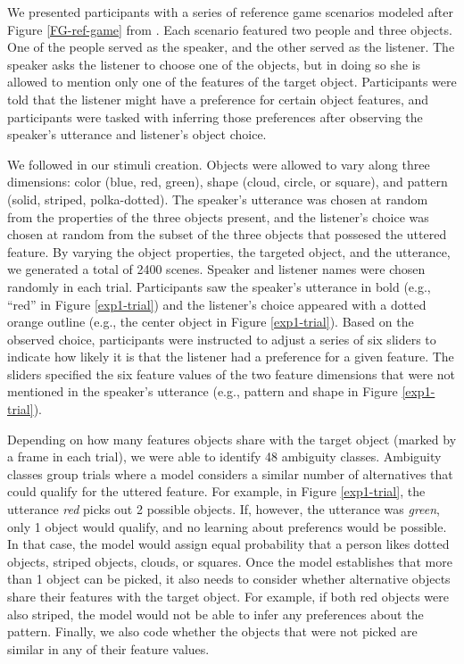 \documentclass[10pt,a4paper]{article}
\begin{document}
We presented participants with a series of reference game scenarios modeled after Figure \ref{FG-ref-game} from . Each scenario featured two people and three objects. One of the people served as the speaker, and the other served as the listener. The speaker asks the listener to choose one of the objects, but in doing so she is allowed to mention only one of the features of the target object. Participants were told that the listener might have a preference for certain object features, and participants were tasked with inferring those preferences after observing the speaker's utterance and listener's object choice.

We followed  in our stimuli creation. Objects were allowed to vary along three dimensions: color (blue, red, green), shape (cloud, circle, or square), and pattern (solid, striped, polka-dotted). The speaker's utterance was chosen at random from the properties of the three objects present, and the listener's choice was chosen at random from the subset of the three objects that possesed the uttered feature. By varying the object properties, the targeted object, and the utterance, we generated a total of 2400 scenes. Speaker and listener names were chosen randomly in each trial. Participants saw the speaker's utterance in bold (e.g., ``red'' in Figure \ref{exp1-trial}) and the listener's choice appeared with a dotted orange outline (e.g., the center object in Figure \ref{exp1-trial}). Based on the observed choice, participants were instructed to adjust a series of six sliders to indicate how likely it is that the listener had a preference for a given feature. The sliders specified the six feature values of the two feature dimensions that were not mentioned in the speaker's utterance (e.g., pattern and shape in Figure \ref{exp1-trial}). 

Depending on how many features objects share with the target object (marked by a frame in each trial), we were able to identify 48 ambiguity classes. Ambiguity classes group trials where a model considers a similar number of alternatives that could qualify for the uttered feature. For example, in Figure \ref{exp1-trial}, the utterance \textit{red} picks out 2 possible objects. If, however, the utterance was \textit{green}, only 1 object would qualify, and no learning about preferencs would be possible. In that case, the model would assign equal probability that a person likes dotted objects, striped objects, clouds, or squares. Once the model establishes that more than 1 object can be picked, it also needs to consider whether alternative objects share their features with the target object. For example, if both red objects were also striped, the model would not be able to infer any preferences about the pattern. Finally, we also code whether the objects that were not picked are similar in any of their feature values.
\end{document}
